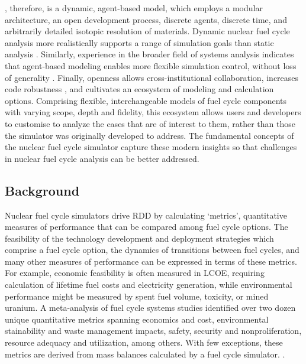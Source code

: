 \Cyclus, therefore, is a dynamic, agent-based model, which employs a modular
architecture, an open development process, discrete agents, discrete time, and
arbitrarily detailed isotopic resolution of materials. Dynamic nuclear fuel
cycle analysis more realistically supports a range of simulation goals than
static analysis \cite{piet_dynamic_2011}. Similarly, experience in the broader
field of systems analysis indicates that agent-based modeling enables more
flexible simulation control, without loss of generality
\cite{macal_agent-based_2010}. Finally, openness allows cross-institutional
collaboration, increases code robustness \cite{cohen_modern_2010}, and
cultivates an ecosystem of modeling and calculation options.  Comprising
flexible, interchangeable models of fuel cycle components with varying scope,
depth and fidelity, this ecosystem allows users and developers to customise
\Cyclus to analyze the cases that are of interest to them, rather than those
the simulator was originally developed to address.  The fundamental concepts of
the \Cyclus nuclear fuel cycle simulator capture these modern insights so that
challenges in nuclear fuel cycle analysis can be better addressed.

\subsection{Background}



Nuclear fuel cycle simulators drive \gls{RDD} by calculating `metrics',
quantitative measures of performance that can be compared among fuel cycle
options. The feasibility of the technology development and deployment
strategies which comprise a fuel cycle option, the dynamics of transitions
between fuel cycles, and many other measures of performance can be expressed in
terms of these metrics. For example, economic feasibility is often measured in
\gls{LCOE}, requiring calculation of lifetime
fuel costs and electricity generation, while environmental performance might be
measured by spent fuel volume, toxicity, or mined uranium.  A meta-analysis of
fuel cycle systems studies identified over two dozen unique quantitative
metrics spanning economics and cost, environmental stainability and waste
management impacts, safety, security and nonproliferation, resource adequacy
and utilization, among others. With few exceptions, these metrics are derived
from mass balances calculated by a fuel cycle simulator.
\cite{flicker_evaluation_2014}.

